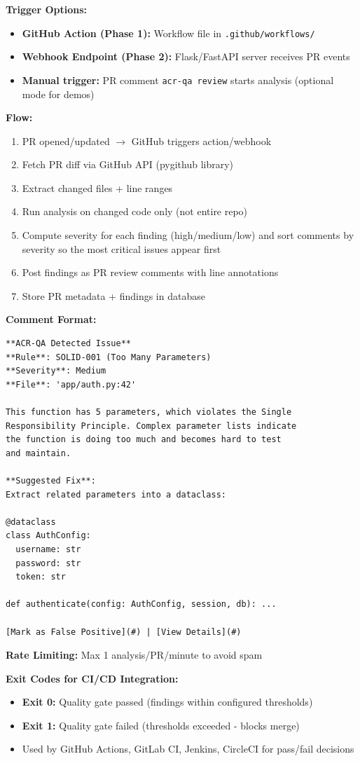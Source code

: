 \documentclass[11pt,a4paper]{article}
\begin{document}
\textbf{Trigger Options:}
\begin{itemize}[leftmargin=*]
    \item \textbf{GitHub Action (Phase 1):} Workflow file in \texttt{.github/workflows/}
    \item \textbf{Webhook Endpoint (Phase 2):} Flask/FastAPI server receives PR events
    \item \textbf{Manual trigger:} PR comment \texttt{acr-qa review} starts analysis (optional mode for demos)
\end{itemize}

\textbf{Flow:}
\begin{enumerate}
    \item PR opened/updated $\rightarrow$ GitHub triggers action/webhook
    \item Fetch PR diff via GitHub API (pygithub library)
    \item Extract changed files + line ranges
    \item Run analysis on changed code only (not entire repo)
    \item Compute severity for each finding (high/medium/low) and sort comments by severity so the most critical issues appear first
    \item Post findings as PR review comments with line annotations
    \item Store PR metadata + findings in database
\end{enumerate}

\textbf{Comment Format:}
\begin{lstlisting}
**ACR-QA Detected Issue**
**Rule**: SOLID-001 (Too Many Parameters)
**Severity**: Medium
**File**: 'app/auth.py:42'

This function has 5 parameters, which violates the Single
Responsibility Principle. Complex parameter lists indicate
the function is doing too much and becomes hard to test
and maintain.

**Suggested Fix**:
Extract related parameters into a dataclass:

@dataclass
class AuthConfig:
  username: str
  password: str
  token: str

def authenticate(config: AuthConfig, session, db): ...

[Mark as False Positive](#) | [View Details](#)
\end{lstlisting}

\textbf{Rate Limiting:} Max 1 analysis/PR/minute to avoid spam

\textbf{Exit Codes for CI/CD Integration:}
\begin{itemize}[leftmargin=*]
    \item \textbf{Exit 0:} Quality gate passed (findings within configured thresholds)
    \item \textbf{Exit 1:} Quality gate failed (thresholds exceeded - blocks merge)
    \item Used by GitHub Actions, GitLab CI, Jenkins, CircleCI for pass/fail decisions
\end{itemize}
\end{document}
